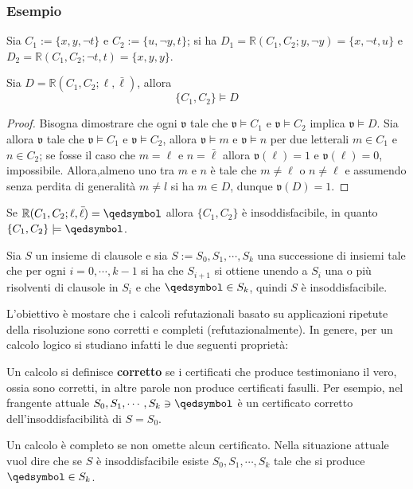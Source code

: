 \subsubsection{Esempio}
Sia $C_1 := \{x, y, \neg t\}$ e $C_2 := \{u, \neg y, t\}$; 
si ha $D_1 = \mathbb{R}(C_1, C_2; y, \neg y) = \{x, \neg t, u\}$ e 
$D_2 = \mathbb{R}(C_1, C_2; \neg t, t) = \{x, y, y\}$. 

\begin{lem}
        Sia $D = \mathbb{R}(C_1, C_2; \ell, \bar{\ell})$, allora 
        $$
        \{C_1, C_2\} \models D
        $$
\end{lem}

\begin{proof}
        Bisogna dimostrare che ogni $\mathfrak{v}$ tale che $\mathfrak{v} \models C_1$ 
        e $\mathfrak{v} \models C_2$ implica $\mathfrak{v} \models D$. Sia allora 
        $\mathfrak{v}$ tale che $\mathfrak{v} \models C_1$ 
        e $\mathfrak{v} \models C_2$, allora $\mathfrak{v} \models m$ e 
        $\mathfrak{v} \models n$ per due letterali $m \in C_1$ e $n \in C_2$; 
        se fosse il caso che $m = \ell$ e  $n = \bar{\ell}$ allora 
        $\mathfrak{v}(\ell) = 1$ e $\mathfrak{v}(\ell) = 0$, impossibile. 
        Allora,almeno uno tra $m$ e $n$ è tale che $m \neq \ell$ o $n \neq \ell$ 
        e assumendo senza perdita di generalità $m \neq l$ si ha 
        $m \in D$, dunque $\mathfrak{v}(D) = 1$. 
\end{proof}

\begin{cor}
        Se $\mathbb{R}(C_1, C_2; \ell, \bar{\ell}) = \qedsymbol$ allora 
        $\{C_1, C_2\}$ è insoddisfacibile, in quanto $\{C_1, C_2\} \models \qedsymbol$.
\end{cor}
\begin{cor}
        Sia $S$ un insieme di clausole e sia $S := S_0, S_1, \cdots, S_k$ una 
        successione di insiemi tale che per ogni $i = 0, \cdots, k-1$ 
        si ha che $S_{i+1}$ si ottiene unendo a $S_i$ una o più risolventi 
        di clausole in $S_i$ e che $\qedsymbol \in S_k$, quindi $S$ è 
        insoddisfacibile.
\end{cor}
L'obiettivo è mostare che i calcoli refutazionali basato su applicazioni 
ripetute della risoluzione sono corretti e completi (refutazionalmente).
In genere, per un calcolo logico si studiano infatti le due
seguenti proprietà:
\begin{defi}[Correttezza]
        Un calcolo si definisce \textbf{corretto} se i certificati che produce 
        testimoniano il vero, ossia sono corretti, in altre parole 
        non produce certificati fasulli. Per esempio, nel frangente attuale 
        $S_0, S_1, \cdots, S_k \ni \qedsymbol$ è un certificato 
        corretto dell'insoddisfacibilità di $S = S_0$. 
\end{defi}
\begin{defi}[Completezza]
        Un calcolo è completo se non omette alcun certificato. Nella situazione 
        attuale vuol dire che se $S$ è insoddisfacibile esiste $S_0, S_1, \cdots, S_k$ 
        tale che si produce $\qedsymbol \in S_k$.
\end{defi}

